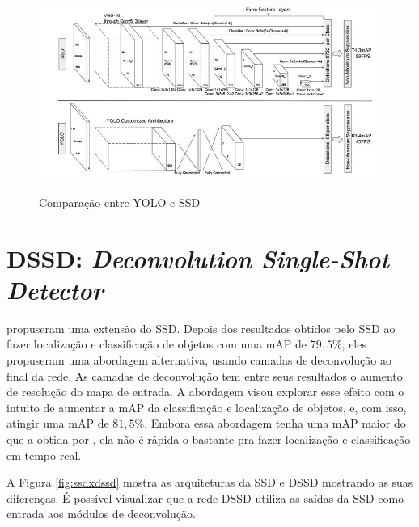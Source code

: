   \begin{figure}[H]
	\setlength{\abovecaptionskip}{0pt}
	\setlength{\belowcaptionskip}{0pt}
	\caption[YOLO e SSD]{Comparação entre \ac{YOLO} e \ac{SSD}}
	\centering
	\includegraphics[width=.6\textwidth]{imagem/0x_yoloxssd.JPG}
	\captionsetup{justification=centering}
	\label{fig:yoloxssd}
\end{figure}

\section{DSSD: \textit{Deconvolution Single-Shot Detector}}
\label{secao:3:3}

 propuseram uma extensão do \ac{SSD}. Depois dos resultados obtidos pelo \ac{SSD} ao fazer localização e classificação de objetos com uma \ac{mAP} de $79,5\%$, eles propuseram uma abordagem alternativa, usando camadas de deconvolução ao final da rede. As camadas de deconvolução tem entre seus resultados o aumento de resolução do mapa de entrada. A abordagem visou explorar esse efeito com o intuito de aumentar a \ac{mAP} da classificação e localização de objetos, e, com isso, atingir uma \ac{mAP} de $81,5\%$. Embora essa abordagem tenha uma \ac{mAP} maior do que a obtida por , ela não é rápida o bastante pra fazer localização e classificação em tempo real.

A Figura \ref{fig:ssdxdssd} mostra as arquiteturas da \ac{SSD} e \ac{DSSD} mostrando as suas diferenças. É possível visualizar que a rede \ac{DSSD} utiliza as saídas da \ac{SSD} como entrada aos módulos de deconvolução.


